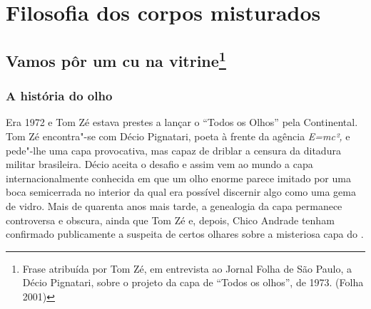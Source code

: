 \chapter{Filosofia dos corpos misturados}



\section{Vamos pôr um cu na vitrine\footnote{Frase
  atribuída por Tom Zé, em entrevista ao Jornal Folha de São Paulo, a
  Décio Pignatari, sobre o projeto da capa de ``Todos os olhos'',
  de 1973. (Folha 2001)}}

\subsection{A história do olho}

Era 1972 e Tom Zé estava prestes a lançar o
 ``Todos os Olhos'' pela Continental. Tom Zé encontra"-se com Décio
Pignatari, poeta à frente da agência \emph{E=mc²,} e pede"-lhe uma capa
provocativa, mas capaz de driblar a censura da ditadura militar
brasileira. Décio aceita o desafio e assim vem ao mundo a capa
internacionalmente conhecida em que um olho enorme parece imitado por
uma boca semicerrada no interior da qual era possível discernir algo
como uma gema de vidro. Mais de quarenta anos mais tarde, a genealogia
da capa permanece controversa e obscura, ainda que Tom Zé e, depois,
Chico Andrade tenham confirmado publicamente a suspeita de certos
olhares sobre a misteriosa capa do .

